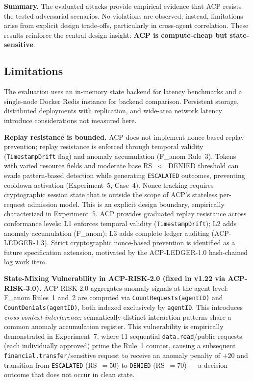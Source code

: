 \documentclass[11pt]{article}
\theoremstyle{definition}
\begin{document}
\medskip
\noindent\textbf{Summary.}
The evaluated attacks provide empirical evidence that ACP resists the tested
adversarial scenarios. No violations are observed; instead, limitations arise from
explicit design trade-offs, particularly in cross-agent correlation.
These results reinforce the central design insight:
\textbf{ACP is compute-cheap but state-sensitive}.

\subsection{Limitations}
\label{sec:limitations}

The evaluation uses an in-memory state backend for latency benchmarks and a
single-node Docker Redis instance for backend comparison.
Persistent storage, distributed deployments with replication, and wide-area
network latency introduce considerations not measured here.

\textbf{Replay resistance is bounded.}
ACP does not implement nonce-based replay prevention; replay resistance is
enforced through temporal validity (\texttt{TimestampDrift} flag) and anomaly
accumulation (F\_anom Rule~3).
Tokens with varied resource fields and moderate base RS~$<$~DENIED threshold
can evade pattern-based detection while generating \texttt{ESCALATED} outcomes,
preventing cooldown activation (Experiment~5, Case~4).
Nonce tracking requires cryptographic session state that is outside the scope of
ACP's stateless per-request admission model.
This is an explicit design boundary, empirically characterized in Experiment~5.
ACP provides graduated replay resistance across conformance levels:
L1 enforces temporal validity (\texttt{TimestampDrift}); L2 adds anomaly accumulation
(F\_anom); L3 adds complete ledger auditing (ACP-LEDGER-1.3).
Strict cryptographic nonce-based prevention is identified as a future specification
extension, motivated by the ACP-LEDGER-1.0 hash-chained log work item.

\textbf{State-Mixing Vulnerability in ACP-RISK-2.0 (fixed in v1.22 via ACP-RISK-3.0).}
\label{sec:state-mixing}
ACP-RISK-2.0 aggregates anomaly signals at the agent level:
F\_anom Rules~1 and~2 are computed via \texttt{CountRequests(agentID)}
and \texttt{CountDenials(agentID)}, both indexed exclusively by \texttt{agentID}.
This introduces \emph{cross-context interference}: semantically distinct interaction
patterns share a common anomaly accumulation register.
This vulnerability is empirically demonstrated in Experiment~7, where 11
sequential \texttt{data.read}/public requests (each individually approved)
prime the Rule~1 counter, causing a subsequent \texttt{financial.transfer}/sensitive
request to receive an anomaly penalty of $+20$ and transition from
\texttt{ESCALATED} (RS~$=50$) to \texttt{DENIED} (RS~$=70$) --- a decision
outcome that does not occur in clean state.
\end{document}
